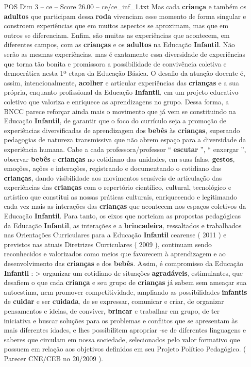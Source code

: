 \begin{textsample}{POS Dim 3 – ce – Score 26.00 – ce/ce\_inf\_1.txt}
Mas cada \textbf{criança} e também os \textbf{adultos} que participam dessa \textbf{roda} vivenciam esse momento de forma singular e constroem experiências que em muitos aspectos se aproximam, mas que em outros se diferenciam.
Enfim, são muitas as experiências que acontecem, em diferentes campos, com as \textbf{crianças} e os \textbf{adultos} na Educação \textbf{Infantil}.
Não serão as mesmas experiências, mas é exatamente essa diversidade de experiências que torna tão bonita e promissora a possibilidade de convivência coletiva e democrática nesta 1ª etapa da Educação Básica.
O desafio da atuação docente é, assim, intencionalmente, \textbf{acolher} e articular experiências das \textbf{crianças} e a sua própria, enquanto profissional da Educação \textbf{Infantil}, em um projeto educativo coletivo que valoriza e enriquece as aprendizagens no grupo.
Dessa forma, a BNCC parece reforçar ainda mais o movimento que já vem se constituindo na Educação \textbf{Infantil}, de garantir que o foco do currículo seja a promoção de experiências diversificadas de aprendizagem dos \textbf{bebês} às \textbf{crianças}, superando pedagogias de natureza transmissiva que não abrem espaço para a diversidade da experiência humana.
Cabe a cada professora/professor “ \textbf{escutar} ”, “ enxergar ”, observar \textbf{bebês} e \textbf{crianças} no cotidiano das unidades, em suas falas, \textbf{gestos}, emoções, ações e interações, registrando e documentando o cotidiano das \textbf{crianças}, dando visibilidade aos movimentos sensíveis de articulação das experiências das \textbf{crianças} com o repertório científico, cultural, tecnológico e artístico que constitui as nossas práticas culturais, enriquecendo e legitimando cada vez mais as interações das \textbf{crianças} que acontecem nos espaços coletivos da Educação \textbf{Infantil}.
Para tanto, os eixos que norteiam as propostas pedagógicas da Educação \textbf{Infantil}, as interações e a \textbf{brincadeira}, ressaltados e trabalhados nas Orientações Curriculares para a Educação \textbf{Infantil} cearense ( 2011 ) e previstos nas atuais Diretrizes Curriculares ( 2009 ), continuam sendo reconhecidos e valorizados como meios que favorecem à aprendizagem e ao desenvolvimento das \textbf{crianças} e dos \textbf{bebês}.
Assim, é compromisso da Educação \textbf{Infantil} : > organizar um cotidiano de situações \textbf{agradáveis}, estimulantes, que desafiem o que cada \textbf{criança} e seu grupo de \textbf{crianças} já sabem sem ameaçar sua autoestima, nem promover competitividade, ampliando as possibilidades \textbf{infantis} de \textbf{cuidar} e ser \textbf{cuidada}, de se expressar, comunicar e criar, de organizar pensamentos e ideias, de conviver, \textbf{brincar} e trabalhar em grupo, de ter iniciativa e buscar soluções para os problemas e conflitos que se apresentam às mais diferentes idades, e lhes possibilitem apropriar -se de diferentes linguagens e saberes que circulam em nossa sociedade, selecionados pelo valor formativo que possuem em relação aos objetivos definidos em seu Projeto Político Pedagógico. ( Parecer CNE/CEB no 20/2009 ).

\end{textsample}

